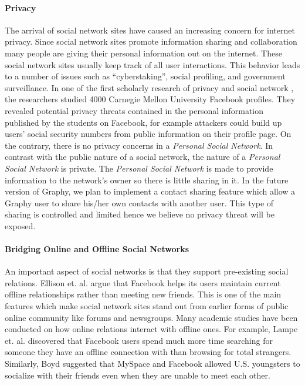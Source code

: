 \paragraph{Privacy}
The arrival of social network sites have caused an increasing concern for internet privacy. Since social network sites promote information sharing and collaboration many people are giving their personal information out on the internet. These social network sites usually keep track of all user interactions. This behavior leads to a number of issues such as ``cyberstaking'', social profiling, and government surveillance. In one of the first scholarly research of privacy and social network \cite{gross2005information}, the researchers studied 4000 Carnegie Mellon University Facebook profiles. They revealed potential privacy threats contained in the personal information published by the students on Facebook, for example attackers could build up users' social security numbers from public information on their profile page. On the contrary, there is no privacy concerns in a \textit{Personal Social Network}. In contrast with the public nature of a social network, the nature of a \textit{Personal Social Network} is private. The \textit{Personal Social Network} is made to provide information to the network's owner so there is little sharing in it. In the future version of Graphy, we plan to implement a contact sharing feature which allow a Graphy user to share his/her own contacts with another user. This type of sharing is controlled and limited hence we believe no privacy threat will be exposed. 

\paragraph{Bridging Online and Offline Social Networks}
An important aspect of social networks is that they support pre-existing social relations. Ellison et. al. \cite{ellison2007benefits} argue that Facebook helps its users maintain current offline relationships rather than meeting new friends. This is one of the main features which make social network sites stand out from earlier forms of public online community like forums and newsgroups. Many academic studies have been conducted on how online relations interact with offline ones. For example, Lampe et. al. \cite{lampe2006face} discovered that Facebook users spend much more time searching for someone they have an offline connection with than browsing for total strangers. Similarly, Boyd \cite{boyd2007youth} suggested that MySpace and Facebook allowed U.S. youngsters to socialize with their friends even when they are unable to meet each other. 

